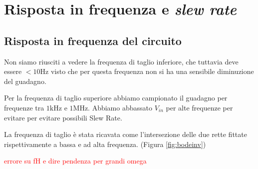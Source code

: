 \documentclass[10pt,a4paper]{article}
\begin{document}
	\section{Risposta in frequenza e \emph{slew rate}}
	\subsection{Risposta in frequenza del circuito}
	Non siamo riusciti a vedere la frequenza di taglio inferiore, che tuttavia deve essere   $ <10\mathrm{Hz}$ visto che per questa frequenza  non si ha una sensibile diminuzione del guadagno.

 Per la frequenza di taglio superiore abbiamo campionato il guadagno per frequenze tra $1\mathrm{kHz}$ e $ 1\mathrm{MHz}.$
Abbiamo abbassato $V_{in}$ per alte frequenze per evitare per evitare  possibili Slew Rate.

La frequenza di taglio è stata ricavata come l'intersezione delle due rette fittate rispettivamente a bassa e ad alta frequenza.
(Figura \ref{fig:bodeinv})

\textcolor{red}{errore su fH e dire pendenza per grandi omega}
\end{document}

